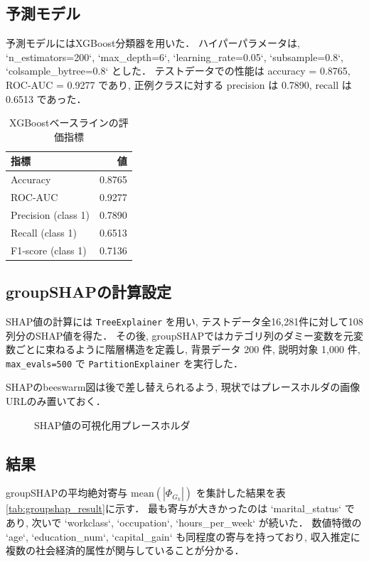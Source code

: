 \documentclass{article}
\begin{document}
\subsection{予測モデル}
予測モデルにはXGBoost分類器を用いた．
ハイパーパラメータは, `n\_estimators=200`, `max\_depth=6`, `learning\_rate=0.05`, `subsample=0.8`, `colsample\_bytree=0.8` とした．
テストデータでの性能は accuracy = 0.8765, ROC-AUC = 0.9277 であり, 正例クラスに対する precision は 0.7890, recall は 0.6513 であった．

\begin{table}[H]
    \centering
    \caption{XGBoostベースラインの評価指標}
    \label{tab:metrics}
    \begin{tabular}{lr}
        \toprule
        指標 & 値 \\
        \midrule
        Accuracy & 0.8765 \\
        ROC-AUC & 0.9277 \\
        Precision (class 1) & 0.7890 \\
        Recall (class 1) & 0.6513 \\
        F1-score (class 1) & 0.7136 \\
        \bottomrule
    \end{tabular}
\end{table}

\subsection{groupSHAPの計算設定}
SHAP値の計算には \texttt{TreeExplainer} を用い, テストデータ全16,281件に対して108列分のSHAP値を得た\cite{lundberg2017unified}．
その後, groupSHAPではカテゴリ列のダミー変数を元変数ごとに束ねるように階層構造を定義し, 背景データ 200 件, 説明対象 1,000 件, \texttt{max\_evals=500} で \texttt{PartitionExplainer} を実行した\cite{jullum2021groupshapley}．

SHAPのbeeswarm図は後で差し替えられるよう, 現状ではプレースホルダの画像URLのみ置いておく．

\begin{figure}[H]
    \centering
    \caption{SHAP値の可視化用プレースホルダ}
    \label{fig:shap_beeswarm_placeholder}
\end{figure}

\subsection{結果}
groupSHAPの平均絶対寄与 $\mathrm{mean}(|\Phi_{G_k}|)$ を集計した結果を表\ref{tab:groupshap_result}に示す．
最も寄与が大きかったのは `marital\_status` であり, 次いで `workclass`, `occupation`, `hours\_per\_week` が続いた．
数値特徴の `age`, `education\_num`, `capital\_gain` も同程度の寄与を持っており, 収入推定に複数の社会経済的属性が関与していることが分かる．
\end{document}
